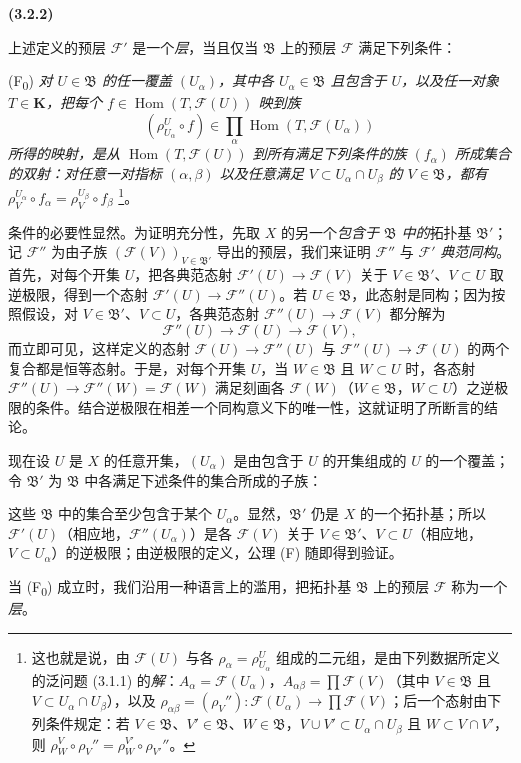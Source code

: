 \documentclass[UTF8,fontset=none,11pt,oneside,openany]{ctexbook}
\newenvironment{env}[1][]{%
  \par\medskip\noindent\textbf{(#1)}\ %
}{\par}
\newcommand{\oldpage}[2][]{%
  \hypertarget{ega-source-page-#1-#2}{}%
  \marginnote{\scriptsize\textbf{#1}~|~#2}\ignorespaces}
\let\EGAOriginalLabel\label
\renewcommand{\label}[1]{\phantomsection\EGAOriginalLabel{#1}}
\begin{document}
\begin{env}[3.2.2]
\label{0.3.2.2-fr}
上述定义的预层 $\mathcal{F}'$ 是一个\emph{层}，当且仅当 $\mathfrak{B}$ 上的预层 $\mathcal{F}$ 满足下列条件：

\smallskip
\noindent
\textup{(F\textsubscript{0})} \emph{对 $U\in\mathfrak{B}$ 的任一覆盖 $(U_\alpha)$，其中各 $U_\alpha\in\mathfrak{B}$ 且包含于 $U$，以及任一对象 $T\in\mathbf{K}$，把每个 $f\in\operatorname{Hom}(T,\mathcal{F}(U))$ 映到族
\[
  (\rho_{U_\alpha}^{U}\circ f)
  \in\prod_\alpha\operatorname{Hom}(T,\mathcal{F}(U_\alpha))
\]
所得的映射，是从 $\operatorname{Hom}(T,\mathcal{F}(U))$ 到所有满足下列条件的族 $(f_\alpha)$ 所成集合的双射：对任意一对指标 $(\alpha,\beta)$ 以及任意满足 $V\subset U_\alpha\cap U_\beta$ 的 $V\in\mathfrak{B}$，都有 $\rho_V^{U_\alpha}\circ f_\alpha=\rho_V^{U_\beta}\circ f_\beta$}%
\footnote{这也就是说，由 $\mathcal{F}(U)$ 与各 $\rho_\alpha=\rho_{U_\alpha}^{U}$ 组成的二元组，是由下列数据所定义的泛问题 (3.1.1) 的\emph{解}：$A_\alpha=\mathcal{F}(U_\alpha)$，$A_{\alpha\beta}=\prod\mathcal{F}(V)$（其中 $V\in\mathfrak{B}$ 且 $V\subset U_\alpha\cap U_\beta$），以及 $\rho_{\alpha\beta}=(\rho_V''):\mathcal{F}(U_\alpha)\to
\prod\mathcal{F}(V)$；后一个态射由下列条件规定：若 $V\in\mathfrak{B}$、$V'\in\mathfrak{B}$、$W\in\mathfrak{B}$，$V\cup V'\subset U_\alpha\cap U_\beta$ 且 $W\subset V\cap V'$，则 $\rho_W^V\circ\rho_V''=\rho_W^{V'}\circ\rho_{V'}''$。}。

条件的必要性显然。为证明充分性，先取 $X$ 的另一个\emph{包含于 $\mathfrak{B}$ 中的}拓扑基 $\mathfrak{B}'$；记 $\mathcal{F}''$ 为由子族 $(\mathcal{F}(V))_{V\in\mathfrak{B}'}$ 导出的预层，我们来证明 $\mathcal{F}''$ 与 $\mathcal{F}'$ \emph{典范同构}。首先，对每个开集 $U$，把各典范态射 $\mathcal{F}'(U)\to\mathcal{F}(V)$ 关于 $V\in\mathfrak{B}'$、$V\subset U$ 取逆极限，得到一个态射 $\mathcal{F}'(U)\to\mathcal{F}''(U)$。若 $U\in\mathfrak{B}$，此态射是同构；因为按照假设，对 $V\in\mathfrak{B}'$、$V\subset U$，各典范态射 $\mathcal{F}''(U)\to\mathcal{F}(V)$ 都分解为
\[
  \mathcal{F}''(U)\to\mathcal{F}(U)\to\mathcal{F}(V),
\]
而立即可见，这样定义的态射 $\mathcal{F}(U)\to\mathcal{F}''(U)$ 与 $\mathcal{F}''(U)\to\mathcal{F}(U)$ 的两个复合都是恒等态射。于是，对每个开集 $U$，当 $W\in\mathfrak{B}$ 且 $W\subset U$ 时，各态射 $\mathcal{F}''(U)\to\mathcal{F}''(W)=\mathcal{F}(W)$ 满足刻画各 $\mathcal{F}(W)$（$W\in\mathfrak{B}$，$W\subset U$）之逆极限的条件。结合逆极限在相差一个同构意义下的唯一性，这就证明了所断言的结论。

现在设 $U$ 是 $X$ 的任意开集，$(U_\alpha)$ 是由包含于 $U$ 的开集组成的 $U$ 的一个覆盖；令 $\mathfrak{B}'$ 为 $\mathfrak{B}$ 中各满足下述条件的集合所成的子族：

\oldpage[0\textsubscript{I}]{27}

这些 $\mathfrak{B}$ 中的集合至少包含于某个 $U_\alpha$。显然，$\mathfrak{B}'$ 仍是 $X$ 的一个拓扑基；所以 $\mathcal{F}'(U)$（相应地，$\mathcal{F}''(U_\alpha)$）是各 $\mathcal{F}(V)$ 关于 $V\in\mathfrak{B}'$、$V\subset U$（相应地，$V\subset U_\alpha$）的逆极限；由逆极限的定义，公理 (F) 随即得到验证。

当 (F\textsubscript{0}) 成立时，我们沿用一种语言上的滥用，把拓扑基 $\mathfrak{B}$ 上的预层 $\mathcal{F}$ 称为一个\emph{层}。
\end{env}
\end{document}
